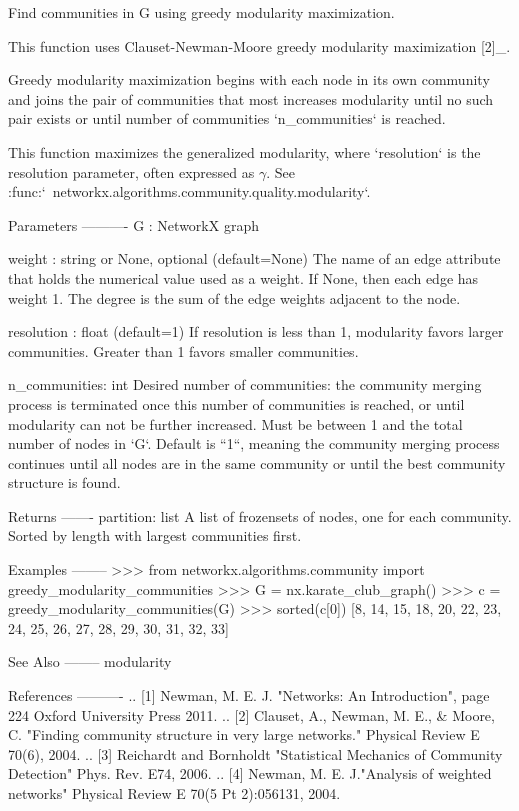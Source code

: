 \begin{DoxyVerb}Find communities in G using greedy modularity maximization.

This function uses Clauset-Newman-Moore greedy modularity maximization [2]_.

Greedy modularity maximization begins with each node in its own community
and joins the pair of communities that most increases modularity until no
such pair exists or until number of communities `n_communities` is reached.

This function maximizes the generalized modularity, where `resolution`
is the resolution parameter, often expressed as $\gamma$.
See :func:`~networkx.algorithms.community.quality.modularity`.

Parameters
----------
G : NetworkX graph

weight : string or None, optional (default=None)
    The name of an edge attribute that holds the numerical value used
    as a weight.  If None, then each edge has weight 1.
    The degree is the sum of the edge weights adjacent to the node.

resolution : float (default=1)
    If resolution is less than 1, modularity favors larger communities.
    Greater than 1 favors smaller communities.

n_communities: int
    Desired number of communities: the community merging process is
    terminated once this number of communities is reached, or until
    modularity can not be further increased. Must be between 1 and the
    total number of nodes in `G`. Default is ``1``, meaning the community
    merging process continues until all nodes are in the same community
    or until the best community structure is found.

Returns
-------
partition: list
    A list of frozensets of nodes, one for each community.
    Sorted by length with largest communities first.

Examples
--------
>>> from networkx.algorithms.community import greedy_modularity_communities
>>> G = nx.karate_club_graph()
>>> c = greedy_modularity_communities(G)
>>> sorted(c[0])
[8, 14, 15, 18, 20, 22, 23, 24, 25, 26, 27, 28, 29, 30, 31, 32, 33]

See Also
--------
modularity

References
----------
.. [1] Newman, M. E. J. "Networks: An Introduction", page 224
   Oxford University Press 2011.
.. [2] Clauset, A., Newman, M. E., & Moore, C.
   "Finding community structure in very large networks."
   Physical Review E 70(6), 2004.
.. [3] Reichardt and Bornholdt "Statistical Mechanics of Community
   Detection" Phys. Rev. E74, 2006.
.. [4] Newman, M. E. J."Analysis of weighted networks"
   Physical Review E 70(5 Pt 2):056131, 2004.
\end{DoxyVerb}
